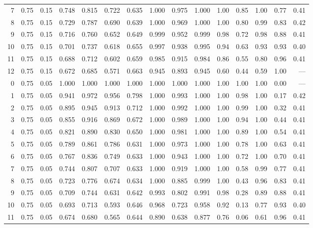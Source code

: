 \begin{landscape}
\begin{longtable}{rrrrrrrrrrrrrrr}
7 & 0.75 & 0.15 & 0.748 & 0.815 & 0.722 & 0.635 & 1.000 & 0.975 & 1.000 & 1.00 & 0.85 & 1.00 & 0.77 & 0.41 \\
8 & 0.75 & 0.15 & 0.729 & 0.787 & 0.690 & 0.639 & 1.000 & 0.969 & 1.000 & 1.00 & 0.80 & 0.99 & 0.83 & 0.42 \\
9 & 0.75 & 0.15 & 0.716 & 0.760 & 0.652 & 0.649 & 0.999 & 0.952 & 0.999 & 0.98 & 0.72 & 0.98 & 0.88 & 0.41 \\
10 & 0.75 & 0.15 & 0.701 & 0.737 & 0.618 & 0.655 & 0.997 & 0.938 & 0.995 & 0.94 & 0.63 & 0.93 & 0.93 & 0.40 \\
11 & 0.75 & 0.15 & 0.688 & 0.712 & 0.602 & 0.659 & 0.985 & 0.915 & 0.984 & 0.86 & 0.55 & 0.80 & 0.96 & 0.41 \\
12 & 0.75 & 0.15 & 0.672 & 0.685 & 0.571 & 0.663 & 0.945 & 0.893 & 0.945 & 0.60 & 0.44 & 0.59 & 1.00 & --- \\
\midrule
0 & 0.75 & 0.05 & 1.000 & 1.000 & 1.000 & 1.000 & 1.000 & 1.000 & 1.000 & 1.00 & 1.00 & 1.00 & 0.00 & --- \\
1 & 0.75 & 0.05 & 0.941 & 0.972 & 0.956 & 0.798 & 1.000 & 0.993 & 1.000 & 1.00 & 0.98 & 1.00 & 0.17 & 0.42 \\
2 & 0.75 & 0.05 & 0.895 & 0.945 & 0.913 & 0.712 & 1.000 & 0.992 & 1.000 & 1.00 & 0.99 & 1.00 & 0.32 & 0.41 \\
3 & 0.75 & 0.05 & 0.855 & 0.916 & 0.869 & 0.672 & 1.000 & 0.989 & 1.000 & 1.00 & 0.94 & 1.00 & 0.44 & 0.41 \\
4 & 0.75 & 0.05 & 0.821 & 0.890 & 0.830 & 0.650 & 1.000 & 0.981 & 1.000 & 1.00 & 0.89 & 1.00 & 0.54 & 0.41 \\
5 & 0.75 & 0.05 & 0.789 & 0.861 & 0.786 & 0.631 & 1.000 & 0.973 & 1.000 & 1.00 & 0.78 & 1.00 & 0.63 & 0.41 \\
6 & 0.75 & 0.05 & 0.767 & 0.836 & 0.749 & 0.633 & 1.000 & 0.943 & 1.000 & 1.00 & 0.72 & 1.00 & 0.70 & 0.41 \\
7 & 0.75 & 0.05 & 0.744 & 0.807 & 0.707 & 0.633 & 1.000 & 0.919 & 1.000 & 1.00 & 0.58 & 0.99 & 0.77 & 0.41 \\
8 & 0.75 & 0.05 & 0.723 & 0.776 & 0.674 & 0.634 & 1.000 & 0.885 & 0.999 & 1.00 & 0.43 & 0.96 & 0.83 & 0.41 \\
9 & 0.75 & 0.05 & 0.709 & 0.744 & 0.631 & 0.642 & 0.993 & 0.802 & 0.991 & 0.98 & 0.28 & 0.89 & 0.88 & 0.41 \\
10 & 0.75 & 0.05 & 0.693 & 0.713 & 0.593 & 0.646 & 0.968 & 0.723 & 0.958 & 0.92 & 0.13 & 0.77 & 0.93 & 0.40 \\
11 & 0.75 & 0.05 & 0.674 & 0.680 & 0.565 & 0.644 & 0.890 & 0.638 & 0.877 & 0.76 & 0.06 & 0.61 & 0.96 & 0.41 \\

\end{longtable}
\end{landscape}
